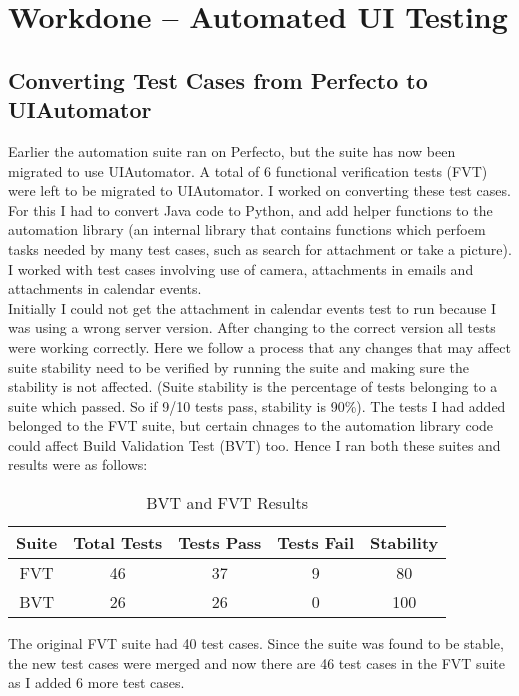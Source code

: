 \setlength\parindent{0pt}

\chapter{Workdone -- Automated UI Testing}

\section{Converting Test Cases from Perfecto to UIAutomator}
Earlier the automation suite ran on Perfecto, but the suite has now been migrated to use UIAutomator. A total of 6 functional verification tests (FVT) were left to be migrated to UIAutomator. I worked on converting these test cases. For this I had to convert Java code to Python, and add helper functions to the automation library (an internal library that contains functions which perfoem tasks needed by many test cases, such as search for attachment or take a picture). I worked with test cases involving use of camera, attachments in emails and attachments in calendar events. \\

Initially I could not get the attachment in calendar events test to run because I was using a wrong server version. After changing to the correct version all tests were working correctly. Here we follow a process that any changes that may affect suite stability need to be verified by running the suite and making sure the stability is not affected. (Suite stability is the percentage of tests belonging to a suite which passed. So if 9/10 tests pass, stability is 90\%). The tests I had added belonged to the FVT suite, but certain chnages to the automation library code could affect Build Validation Test (BVT) too. Hence I ran both these suites and results were as follows:

\begin{table}[!h]
\centering
\caption{BVT and FVT Results}
\begin{tabular}{|c|c|c|c|c|}
\hline
Suite & Total Tests & Tests Pass & Tests Fail & Stability \\ \hline
FVT   & 46          & 37         & 9          & 80        \\ \hline
BVT   & 26          & 26         & 0          & 100       \\ \hline         
\end{tabular}
\end{table} 

The original FVT suite had 40 test cases. Since the suite was found to be stable, the new test cases were merged and now there are 46 test cases in the FVT suite as I added 6 more test cases.

